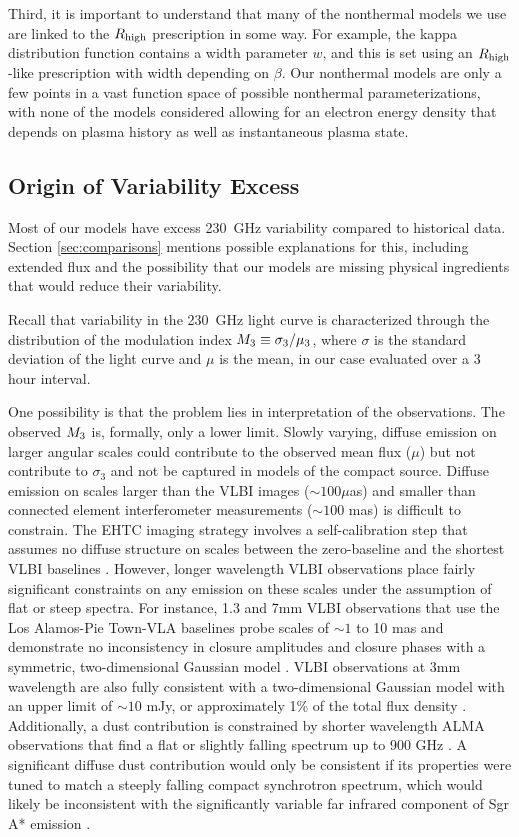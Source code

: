 Third, it is important to understand that many of the nonthermal models we use are linked to the $R_\mathrm{high}$ prescription in some way.  For example, the kappa distribution function contains a width parameter $w$, and this is set using an $R_\mathrm{high}$-like prescription with width depending on $\beta$.  Our nonthermal models are only a few points in a vast function space of possible nonthermal parameterizations, with none of the models considered allowing for an electron energy density that depends on plasma history as well as instantaneous plasma state.  

\subsection{Origin of Variability Excess}

Most of our models have excess 230~GHz variability compared to historical data.
Section \ref{sec:comparisons} mentions possible explanations for this, including extended flux and the possibility that our models are missing physical ingredients that would reduce their variability.  

Recall that variability in the 230~GHz light curve is characterized through the distribution of the modulation index $M_{3} \equiv \sigma_3/\mu_3$, where $\sigma$ is the standard deviation of the light curve and $\mu$ is the mean, in our case evaluated over a 3 hour interval.

One possibility is that the problem lies in interpretation of the observations. 
The observed $M_{3}$ is, formally, only a lower limit.  Slowly varying, diffuse emission on larger angular scales could contribute to the observed mean flux ($\mu$) but not contribute to $\sigma_3$ and not be captured in models of the compact source.  Diffuse emission on scales larger than the VLBI images ($\sim 100 \mu$as) and smaller than connected element interferometer measurements ($\sim 100$ mas) is difficult to constrain.  The EHTC imaging strategy involves a self-calibration step that assumes no diffuse structure on scales between the zero-baseline and the shortest VLBI baselines \citep{PaperIII}.  However, longer wavelength VLBI observations place fairly significant constraints on any emission on these scales under the assumption of flat or steep spectra.  For instance, 1.3 and 7mm VLBI observations that use the Los Alamos-Pie Town-VLA baselines probe scales of $\sim 1$ to 10 mas and demonstrate no inconsistency in closure amplitudes and closure phases with a symmetric, two-dimensional Gaussian model \citep{2004Sci...304..704B}.  VLBI observations at 3mm wavelength are also fully consistent with a two-dimensional Gaussian model with an upper limit of $\sim 10$ mJy, or approximately 1\% of the total flux density \citep{2019A&A...621A.119B}. Additionally, a dust contribution is constrained by shorter wavelength ALMA observations that find a flat or slightly falling spectrum up to 900 GHz \citep{2019ApJ...881L...2B}.  A significant diffuse dust contribution would only be consistent if its properties were tuned to match a steeply falling compact synchrotron spectrum, which would likely be inconsistent with the significantly variable far infrared component of Sgr A* emission \citep{2016ApJ...825...32S, 2018ApJ...862..129V}.

